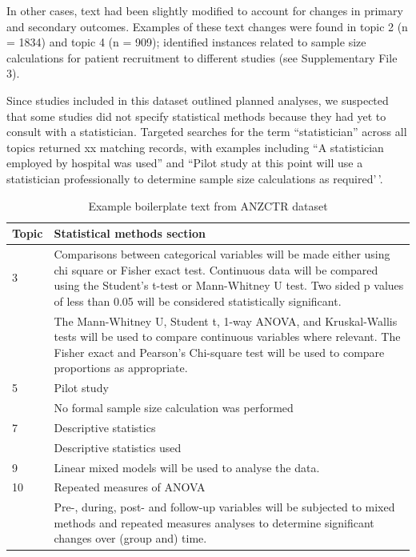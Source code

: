\documentclass[12pt]{article}
\begin{document}
In other cases, text had been slightly modified to account for changes
in primary and secondary outcomes. Examples of these text changes were
found in topic 2 (n = 1834) and topic 4 (n = 909); identified instances
related to sample size calculations for patient recruitment to different
studies (see Supplementary File 3).

Since studies included in this dataset outlined planned analyses, we
suspected that some studies did not specify statistical methods because
they had yet to consult with a statistician. Targeted searches for the
term ``statistician'' across all topics returned xx matching records,
with examples including ``A statistician employed by hospital was used''
and ``Pilot study at this point will use a statistician professionally
to determine sample size calculations as required'\,'.

\begin{landscape}
\begin{table}[]
\centering
\caption{Example boilerplate text from ANZCTR dataset}
\label{tab:anzctr-example-boilerplate}
\begin{tabular}{p{0.1\linewidth} p{0.9\linewidth}}
\hline
\textbf{Topic} & \textbf{Statistical methods section} \\ \hline
3 & Comparisons between categorical variables will be made either using chi square or Fisher exact test. Continuous data will be compared using the Student’s t-test or Mann-Whitney U test. Two sided p values of less than 0.05 will be considered statistically significant.\\
 &  The Mann-Whitney U, Student t, 1-way ANOVA, and Kruskal-Wallis tests will be used to compare continuous variables where relevant. The Fisher exact and Pearson’s Chi-square test will be used to compare proportions as appropriate. \\ \hline
5 & Pilot study \\
 &  No formal sample size calculation was performed \\ \hline
7 & Descriptive statistics \\
 &  Descriptive statistics used \\ \hline
9 & Linear mixed models will be used to analyse the data. \\ \hline
10 & Repeated measures of ANOVA \\
 &  Pre-, during, post- and follow-up variables will be subjected to mixed methods and repeated measures analyses to determine significant changes over (group and) time. \\ \hline
\end{tabular}
\end{table}
\end{landscape}
\end{document}
